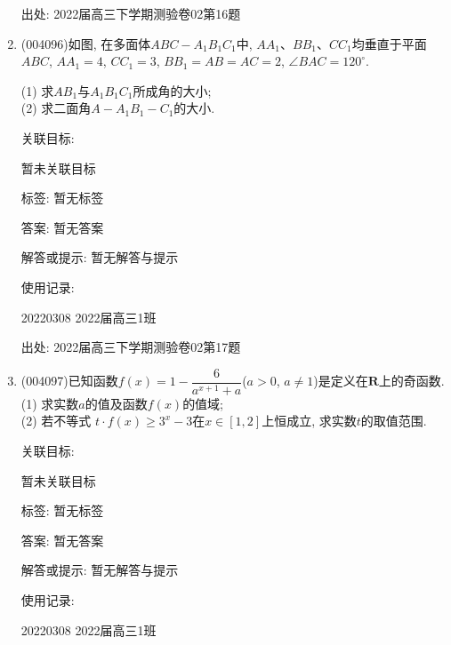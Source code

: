 \documentclass[10pt,a4paper]{article}
\begin{document}
\begin{enumerate}[1.]
出处: 2022届高三下学期测验卷02第16题
\item { (004096)}如图, 在多面体$ABC-A_1B_1C_1$中, $AA_1$、$BB_1$、$CC_1$均垂直于平面$ABC$, $AA_1=4$, $CC_1=3$, $BB_1=AB=AC=2$, $\angle BAC=120^\circ$.
\begin{center}
\end{center}
(1) 求$AB_1$与$A_1B_1C_1$所成角的大小;\\
(2) 求二面角$A-A_1B_1-C_1$的大小.


关联目标:

暂未关联目标



标签: 暂无标签

答案: 暂无答案

解答或提示: 暂无解答与提示

使用记录:

20220308	2022届高三1班		


出处: 2022届高三下学期测验卷02第17题
\item { (004097)}已知函数$f(x)=1-\dfrac 6{a^{x+1}+a}$($a>0$, $a\ne 1$)是定义在$\mathbf{R}$上的奇函数.\\
(1) 求实数$a$的值及函数$f(x)$的值域;\\
(2) 若不等式 $t\cdot f(x)\ge 3^x-3$在$x\in [1,2]$上恒成立, 求实数$t$的取值范围.


关联目标:

暂未关联目标



标签: 暂无标签

答案: 暂无答案

解答或提示: 暂无解答与提示

使用记录:

20220308	2022届高三1班		



\end{enumerate}
\end{document}
